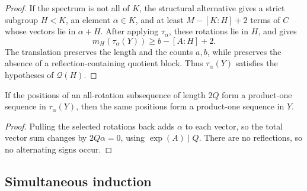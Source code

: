 \begin{proof}
If the spectrum is not all of \(K\), the structural alternative gives
a strict subgroup \(H<K\), an element \(\alpha\in K\), and at least
\(M-[K:H]+2\) terms of \(C\) whose vectors lie in \(\alpha+H\).
After applying \(\tau_\alpha\), these rotations lie in \(H\), and
 gives
\[
  m_H(\tau_\alpha(Y))\ge b-[A:H]+2.
\]
The translation preserves the length and the counts \(a,b\), while
 preserves the absence of a
reflection-containing quotient block. Thus \(\tau_\alpha(Y)\) satisfies
the hypotheses of \(\mathcal Q(H)\).
\end{proof}

\begin{lemma}
\label{lem:translation-pullback}
If the positions of an all-rotation subsequence of length \(2Q\) form a
product-one sequence in \(\tau_\alpha(Y)\), then the same positions form
a product-one sequence in \(Y\).
\end{lemma}

\begin{proof}
Pulling the selected rotations back adds \(\alpha\) to each vector, so
the total vector sum changes by \(2Q\alpha=0\), using
\(\exp(A)\mid Q\). There are no reflections, so no alternating signs
occur.
\end{proof}

\subsection{Simultaneous induction}


